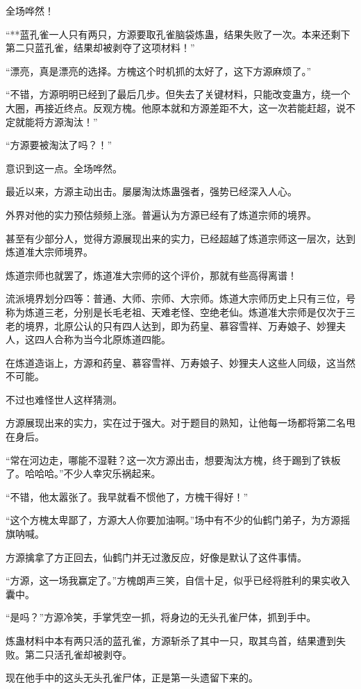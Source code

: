 \begin{this_body}
全场哗然！

“**蓝孔雀一人只有两只，方源要取孔雀脑袋炼蛊，结果失败了一次。本来还剩下第二只蓝孔雀，结果却被剥夺了这项材料！”

“漂亮，真是漂亮的选择。方槐这个时机抓的太好了，这下方源麻烦了。”

“不错，方源明明已经到了最后几步。但失去了关键材料，只能改变蛊方，绕一个大圈，再接近终点。反观方槐。他原本就和方源差距不大，这一次若能赶超，说不定就能将方源淘汰！”

“方源要被淘汰了吗？！”

意识到这一点。全场哗然。

最近以来，方源主动出击。屡屡淘汰炼蛊强者，强势已经深入人心。

外界对他的实力预估频频上涨。普遍认为方源已经有了炼道宗师的境界。

甚至有少部分人，觉得方源展现出来的实力，已经超越了炼道宗师这一层次，达到炼道准大宗师境界。

炼道宗师也就罢了，炼道准大宗师的这个评价，那就有些高得离谱！

流派境界划分四等：普通、大师、宗师、大宗师。炼道大宗师历史上只有三位，号称为炼道三老，分别是长毛老祖、天难老怪、空绝老仙。炼道准大宗师是仅次于三老的境界，北原公认的只有四人达到，即为药皇、慕容雪祥、万寿娘子、妙狸夫人，这四人合称为当今北原炼道四能。

在炼道造诣上，方源和药皇、慕容雪祥、万寿娘子、妙狸夫人这些人同级，这当然不可能。

不过也难怪世人这样猜测。

方源展现出来的实力，实在过于强大。对于题目的熟知，让他每一场都将第二名甩在身后。

“常在河边走，哪能不湿鞋？这一次方源出击，想要淘汰方槐，终于踢到了铁板了。哈哈哈。”不少人幸灾乐祸起来。

“不错，他太嚣张了。我早就看不惯他了，方槐干得好！”

“这个方槐太卑鄙了，方源大人你要加油啊。”场中有不少的仙鹤门弟子，为方源摇旗呐喊。

方源擒拿了方正回去，仙鹤门并无过激反应，好像是默认了这件事情。

“方源，这一场我赢定了。”方槐朗声三笑，自信十足，似乎已经将胜利的果实收入囊中。

“是吗？”方源冷笑，手掌凭空一抓，将身边的无头孔雀尸体，抓到手中。

炼蛊材料中本有两只活的蓝孔雀，方源斩杀了其中一只，取其鸟首，结果遭到失败。第二只活孔雀却被剥夺。

现在他手中的这头无头孔雀尸体，正是第一头遗留下来的。


\end{this_body}
